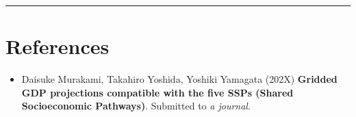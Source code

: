 \documentclass[]{book}
\providecommand{\tightlist}{%
  \setlength{\itemsep}{0pt}\setlength{\parskip}{0pt}}
\begin{document}
\begin{center}\rule{0.5\linewidth}{\linethickness}\end{center}

\hypertarget{references}{%
\section*{References}\label{references}}

\begin{itemize}
\tightlist
\item
  Daisuke Murakami, Takahiro Yoshida, Yoshiki Yamagata (202X) \textbf{Gridded GDP projections compatible with the five SSPs (Shared Socioeconomic Pathways)}. Submitted to \emph{a journal}.
\end{itemize}


\end{document}
